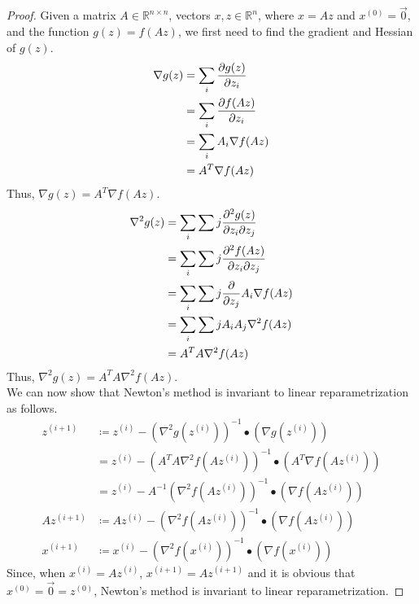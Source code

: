 \documentclass[11pt,a4paper,titlepage]{article}
\newcommand{\R}{\mathbb{R}}
\begin{document}
\section{}{
\subsection{}{
\begin{proof}
Given a matrix $A\in\R^{n\times n}$, vectors $x, z \in\R^n$, where $x = Az$ and $x^{(0)} = \vec{0}$, and the function $g(z) = f(Az)$, we first need to find the gradient and Hessian of $g(z)$.
\begin{align*}
	\nabla g(z) &= \sum_{i} \pdv{g(z)}{z_i}
    \\&= \sum_{i} \pdv{f(Az)}{z_i}
    \\&= \sum_{i} A_i \nabla f(Az)
    \\&= A^T \nabla f(Az)
\end{align*}
Thus, $\nabla g(z) = A^T \nabla f(Az)$.
\begin{align*}
	\nabla^2g(z) &= \sum_{i}\sum{j} \pdv{g(z)}{z_i}{z_j}
    \\&= \sum_{i}\sum{j} \pdv{f(Az)}{z_i}{z_j}
    \\&= \sum_{i}\sum{j} \pdv{}{z_j} A_i \nabla f(Az)
    \\&= \sum_{i}\sum{j} A_iA_j \nabla^2 f(Az)
    \\&= A^TA \nabla^2 f(Az)
\end{align*}
Thus, $\nabla^2 g(z) = A^TA \nabla^2 f(Az)$.
\\ \quad We can now show that Newton's method is invariant to linear reparametrization as follows.
\begin{align*}
	z^{(i+1)} &\coloneqq z^{(i)} - (\nabla^2 g(z^{(i)}))^{-1} \bullet (\nabla g(z^{(i)}))
    \\&= z^{(i)} - (A^TA\nabla^2 f(Az^{(i)}))^{-1} \bullet (A^T \nabla f(Az^{(i)}))
    \\&= z^{(i)} - A^{-1}(\nabla^2 f(Az^{(i)}))^{-1} \bullet (\nabla f(Az^{(i)}))
  \\Az^{(i+1)} &\coloneqq Az^{(i)} - (\nabla^2 f(Az^{(i)}))^{-1} \bullet (\nabla f(Az^{(i)}))
  \\x^{(i+1)} &\coloneqq x^{(i)} - (\nabla^2 f(x^{(i)}))^{-1} \bullet (\nabla f(x^{(i)}))
\end{align*}
Since, when $x^{(i)} = Az^{(i)}$, $x^{(i+1)} = Az^{(i+1)}$ and it is obvious that $x^{(0)} = \vec{0} = z^{(0)}$, Newton's method is invariant to linear reparametrization.
\end{proof}
}\label{prob:4a}
}
\end{document}
